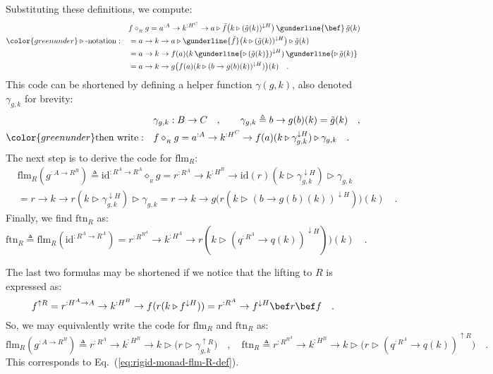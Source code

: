 Substituting these definitions, we compute:
\begin{align*}
 & f\diamond_{_{R}}g=a^{:A}\rightarrow k^{:H^{C}}\rightarrow a\triangleright\tilde{f}\big(k\triangleright(\tilde{g}(k))^{\downarrow H}\big)\,\gunderline{\bef}\,\tilde{g}(k)\\
{\color{greenunder}\triangleright\text{-notation}:}\quad & =a\rightarrow k\rightarrow a\triangleright\gunderline{\tilde{f}}\big(k\triangleright(\tilde{g}(k))^{\downarrow H}\big)\triangleright\tilde{g}(k)\\
 & =a\rightarrow k\rightarrow f(a)(k\,\gunderline{\triangleright\,(\tilde{g}(k)})^{\downarrow H})\,\gunderline{\triangleright\,\tilde{g}(k)}\\
 & =a\rightarrow k\rightarrow g\big(f(a)(k\triangleright(b\rightarrow g(b)(k))^{\downarrow H})\big)(k)\quad.
\end{align*}
This code can be shortened by defining a helper function $\gamma(g,k)$,
also denoted $\gamma_{g,k}$ for brevity:
\begin{align*}
 & \gamma_{g,k}:B\rightarrow C\quad,\quad\quad\gamma_{g,k}\triangleq b\rightarrow g(b)(k)=\tilde{g}(k)\quad,\\
{\color{greenunder}\text{then write}:}\quad & f\diamond_{_{R}}g=a^{:A}\rightarrow k^{:H^{C}}\rightarrow f(a)(k\triangleright\gamma_{g,k}^{\downarrow H})\triangleright\gamma_{g,k}\quad.
\end{align*}
The next step is to derive the code for $\text{flm}_{R}$:
\begin{align*}
 & \text{flm}_{R}(g^{:A\rightarrow R^{B}})\triangleq\text{id}^{:R^{A}\rightarrow R^{A}}\diamond_{_{R}}g=r^{:R^{A}}\rightarrow k^{:H^{B}}\rightarrow\text{id}\left(r\right)(k\triangleright\gamma_{g,k}^{\downarrow H})\triangleright\gamma_{g,k}\\
 & =r\rightarrow k\rightarrow r(k\triangleright\gamma_{g,k}^{\downarrow H})\triangleright\gamma_{g,k}=r\rightarrow k\rightarrow g\big(r(k\triangleright(b\rightarrow g(b)(k))^{\downarrow H})\big)(k)\quad.
\end{align*}
Finally, we find $\text{ftn}_{R}$ as:
\[
\text{ftn}_{R}\triangleq\text{flm}_{R}(\text{id}^{:R^{A}\rightarrow R^{A}})=r^{:R^{R^{A}}}\rightarrow k^{:H^{A}}\rightarrow r(k\triangleright(q^{:R^{A}}\rightarrow q(k))^{\downarrow H})\big)(k)\quad.
\]

The last two formulas may be shortened if we notice that the lifting
to $R$ is expressed as:
\[
f^{\uparrow R}=r^{:H^{A}\rightarrow A}\rightarrow k^{:H^{B}}\rightarrow f(r(k\triangleright f^{\downarrow H}))=r^{:R^{A}}\rightarrow f^{\downarrow H}\bef r\bef f\quad.
\]
So, we may equivalently write the code for $\text{flm}_{R}$ and $\text{ftn}_{R}$
as:
\[
\text{flm}_{R}(g^{:A\rightarrow R^{B}})\triangleq r^{:R^{A}}\rightarrow k^{:H^{B}}\rightarrow k\triangleright\big(r\triangleright\gamma_{g,k}^{\uparrow R}\big)\quad,\quad\text{ftn}_{R}\triangleq r^{:R^{R^{A}}}\rightarrow k^{:H^{B}}\rightarrow k\triangleright\big(r\triangleright(q^{:R^{A}}\rightarrow q(k))^{\uparrow R}\big)\quad.
\]
This corresponds to Eq.~(\ref{eq:rigid-monad-flm-R-def}).

